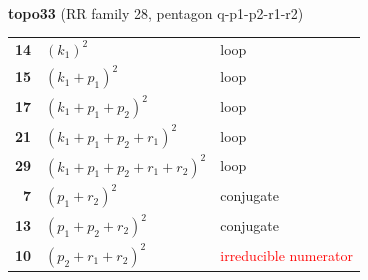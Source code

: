 \documentclass[10pt]{article}
\begin{document}
\begin{minipage}[t]{0.48\textwidth}
{}\\[2mm]\textbf{topo33} (RR family 28, pentagon q-p1-p2-r1-r2)\\[2pt]{\footnotesize\begin{tabular}{@{}r@{\ \ }l@{\ \ }l@{}}\textbf{14} & $(k_1)^2$ & loop\\
\textbf{15} & $(k_1+p_1)^2$ & loop\\
\textbf{17} & $(k_1+p_1+p_2)^2$ & loop\\
\textbf{21} & $(k_1+p_1+p_2+r_1)^2$ & loop\\
\textbf{29} & $(k_1+p_1+p_2+r_1+r_2)^2$ & loop\\
\textbf{7} & $(p_1+r_2)^2$ & conjugate\\
\textbf{13} & $(p_1+p_2+r_2)^2$ & conjugate\\
\textbf{10} & $(p_2+r_1+r_2)^2$ & \textcolor{red}{irreducible numerator}\\\end{tabular}}\end{minipage}\hfill%
\end{document}
